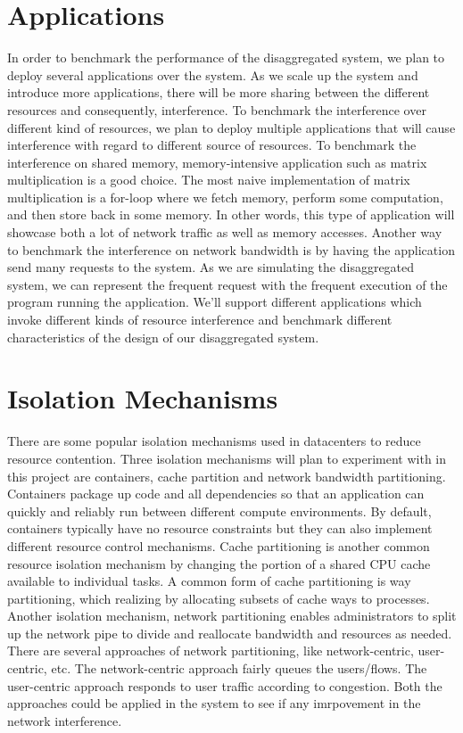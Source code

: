 \documentclass{article}
\begin{document}
\section{Applications}
In order to benchmark the performance of the disaggregated system, we plan to deploy several applications over the system. As we scale up the system and introduce more applications, there will be more sharing between the different resources and consequently, interference. To benchmark the interference over different kind of resources, we plan to deploy multiple applications that will cause interference with regard to different source of resources. To benchmark the interference on shared memory, memory-intensive application such as matrix multiplication is a good choice. The most naive implementation of matrix multiplication is a for-loop where we fetch memory, perform some computation, and then store back in some memory. In other words, this type of application will showcase both a lot of network traffic as well as memory accesses. Another way to benchmark the interference on network bandwidth is by having the application send many requests to the system. As we are simulating the disaggregated system, we can represent the frequent request with the frequent execution of the program running the application. We'll support different applications which invoke different kinds of resource interference and  benchmark different characteristics of the design of our disaggregated system.

\section{Isolation Mechanisms}
There are some popular isolation mechanisms used in datacenters to reduce resource contention. Three isolation mechanisms will plan to experiment with in this project are containers, cache partition and network bandwidth partitioning. Containers package up code and all dependencies so that an application can quickly and reliably run between different compute environments. By default, containers typically have no resource constraints but they can also implement different resource control mechanisms. Cache partitioning is another common resource isolation mechanism by changing the portion of a shared CPU cache available to individual tasks. A common form of cache partitioning is way partitioning, which realizing by allocating subsets of cache ways to processes. Another isolation mechanism, network partitioning enables administrators to split up the network pipe to divide and reallocate bandwidth and resources as needed. There are several approaches of network partitioning, like network-centric, user-centric, etc. The network-centric approach fairly queues the users/flows. The user-centric approach responds to user traffic according to congestion. Both the approaches could be applied in the system to see if any imrpovement in the network interference.
\end{document}
